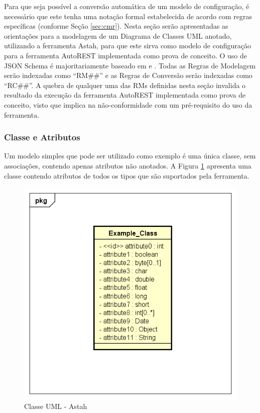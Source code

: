 Para que seja possível a conversão automática de um modelo de configuração, é necessário que este tenha uma notação formal estabelecida de acordo com regras específicas (conforme Seção \ref{sec:cmr}). Nesta seção serão apresentadas as orientações para a modelagem de um Diagrama de Classes UML anotado, utilizando a ferramenta Astah, para que este sirva como modelo de configuração para a ferramenta AutoREST implementada como prova de conceito. O uso de JSON Schema é majoritariamente baseado em  e . Todas as Regras de Modelagem serão indexadas como ``RM\#\#'' e as Regras de Conversão serão indexadas como ``RC\#\#''. A quebra de qualquer uma das RMs definidas nesta seção invalida o resultado da execução da ferramenta AutoREST implementada como prova de conceito, visto que implica na não-conformidade com um pré-requisito do uso da ferramenta.


\subsubsection{Classe e Atributos}

Um modelo simples que pode ser utilizado como exemplo é uma única classe, sem associações, contendo apenas atributos não anotados. A Figura \ref{fig_example_class} apresenta uma classe contendo atributos de todos os tipos que são suportados pela ferramenta.

\begin{figure}[htb]
    \begin{center}
        \includegraphics[scale=0.7]{imagens/Example_Class.png}
    \end{center}
	\caption{\label{fig_example_class}Classe UML - Astah}
\end{figure}

